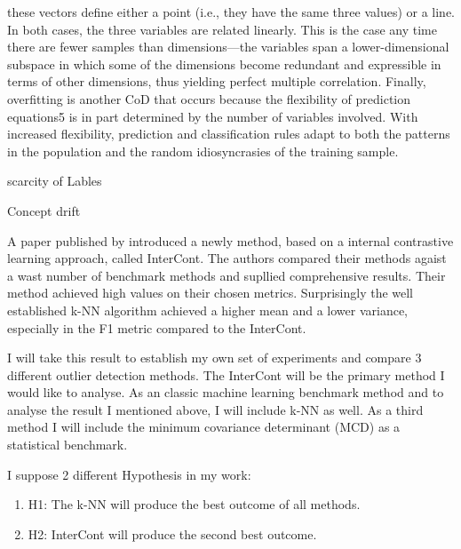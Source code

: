 these vectors define either a point (i.e., they have the same three values) or a line. In both cases, the three variables are related linearly.
This is the case any time there are fewer samples than dimensions—the variables span a lower-dimensional subspace in which some
of the dimensions become redundant and expressible in terms of other dimensions, thus yielding perfect multiple correlation.
Finally, overfitting is another CoD that occurs because the flexibility of prediction equations5 is in part determined
by the number of variables involved. With increased flexibility, prediction and classification rules adapt to both the
patterns in the population and the random idiosyncrasies of the training sample. \citep[p.1pp]{altman2018curse}


scarcity of Lables

Concept drift


A paper published by \citep{shenkar2022anomaly} introduced a newly method, based on a internal contrastive learning approach, called InterCont.
The authors compared their methods agaist a wast number of benchmark methods and supllied comprehensive results.
Their method achieved high values on their chosen metrics. 
Surprisingly the well established k-NN algorithm achieved a higher mean and a lower variance, especially in the F1 metric compared to the InterCont.


I will take this result to establish my own set of experiments and compare 3 different outlier detection methods. 
The InterCont will be the primary method I would like to analyse. 
As an classic machine learning benchmark method and to analyse the result I mentioned above, I will include k-NN as well.
As a third method I will include the minimum covariance determinant (MCD) as a statistical benchmark.


I suppose 2 different Hypothesis in my work:
\begin{enumerate}
    \item H1: The k-NN will produce the best outcome of all methods. 
    \item H2: InterCont will produce the second best outcome. 
\end{enumerate}



